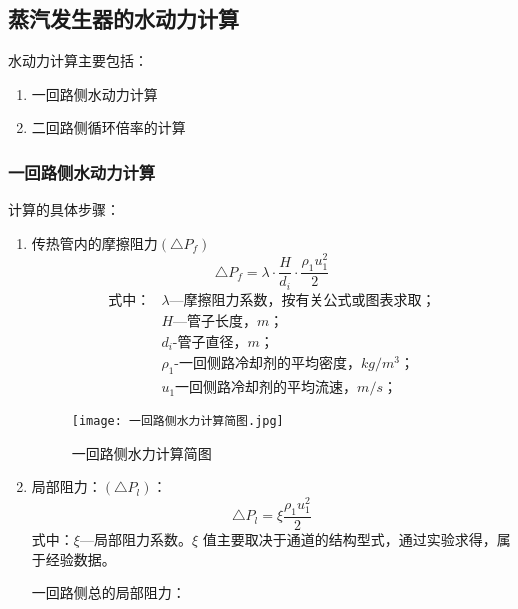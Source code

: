 \subsection{蒸汽发生器的水动力计算}
水动力计算主要包括：
\begin{enumerate}
    \item 一回路侧水动力计算
    \item 二回路侧循环倍率的计算
\end{enumerate}

\subsubsection{一回路侧水动力计算}
计算的具体步骤：
\begin{enumerate}
    \item 传热管内的摩擦阻力$(\bigtriangleup P_f)$
          \begin{equation*}
              \bigtriangleup P_f = \lambda \cdot \frac{H}{d_i} \cdot \frac{\rho_1u_{1}^{2}}{2}
          \end{equation*}
          \begin{align*}
              \text{式中：} & \lambda \text{—摩擦阻力系数，按有关公式或图表求取；}       \\
                            & H \text{—管子长度，}m\text{；}                             \\
                            & d_i \text{-管子直径，}m\text{；}                           \\
                            & \rho_1 \text{-一回侧路冷却剂的平均密度，} kg/m^3 \text{；} \\
                            & u_1 \text{一回侧路冷却剂的平均流速，} m/s \text{；}
          \end{align*}
          \begin{figure}[H]
              \centering
              \texttt{[image: 一回路侧水力计算简图.jpg]}
              \caption{一回路侧水力计算简图}
              \label{Fig.1}
          \end{figure}
    \item 局部阻力：$ ( \bigtriangleup P_l) $：
          \begin{equation*}
              \bigtriangleup P_l = \xi \frac{\rho_1u_{1}^{2}}{2}
          \end{equation*}
          式中：$ \xi $—局部阻力系数。$ \xi $ 值主要取决于通道的结构型式，通过实验求得，属于经验数据。
          \par 一回路侧总的局部阻力：

\end{enumerate}
